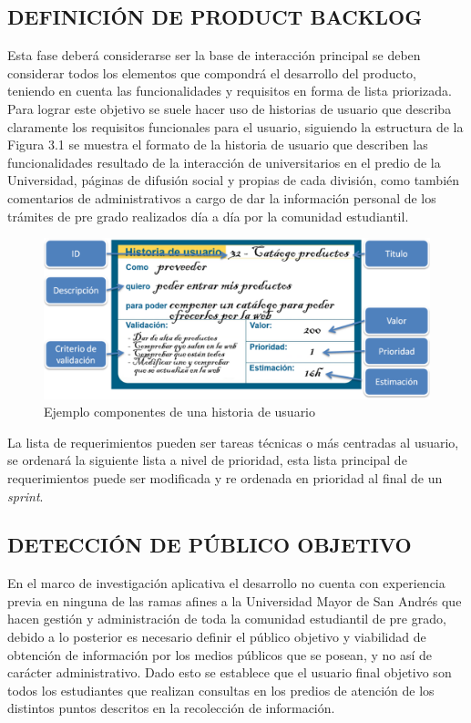 \documentclass[letter, openright, 12pt]{book}
\newcommand*\setcaptioncitation[1]{\def\captioncitation{\textit{Fuente:}~#1}}
\let\captioncitation\relax
\begin{document}
\subsection{DEFINICIÓN DE { \bf  PRODUCT BACKLOG}}

Esta fase deberá considerarse ser la base de interacción principal se deben considerar todos los elementos que compondrá el desarrollo del producto, teniendo en cuenta las funcionalidades y requisitos en forma de lista priorizada. Para lograr este objetivo se suele hacer uso de historias de usuario que describa claramente los requisitos funcionales para el usuario, siguiendo la estructura de la Figura 3.1 se muestra el formato de la historia de usuario que describen las funcionalidades resultado de la interacción de universitarios en el predio de la Universidad, páginas de difusión social y propias de cada división, como también comentarios de administrativos a cargo de dar la información personal de los trámites de pre grado realizados día a día por la comunidad estudiantil. 
\begin{figure}[htb]
\centering
\includegraphics[width=1\textwidth]{figura3_1}
 \setcaptioncitation{(Menzinsky, 2016)}
 \caption{Ejemplo componentes de una historia de usuario}
\label{fig:figura3_1}
\end{figure}
\par
La lista de requerimientos pueden ser tareas técnicas o más centradas al usuario, se ordenará la siguiente lista a nivel de prioridad, esta lista principal de requerimientos puede ser modificada y re ordenada en prioridad al final de un {\it sprint}. 
\subsection{DETECCIÓN DE PÚBLICO OBJETIVO}
\par
En el marco de investigación aplicativa el desarrollo no cuenta con experiencia previa en ninguna de las ramas afines a la Universidad Mayor de San Andrés que hacen gestión y administración de toda la comunidad estudiantil de pre grado, debido a lo posterior es necesario definir el público objetivo y viabilidad de obtención de información por los medios públicos que se posean, y no así de carácter administrativo. Dado esto se establece que el usuario final objetivo son todos los estudiantes que realizan consultas en los predios de atención de los distintos puntos descritos en la recolección de información. 
\end{document}
